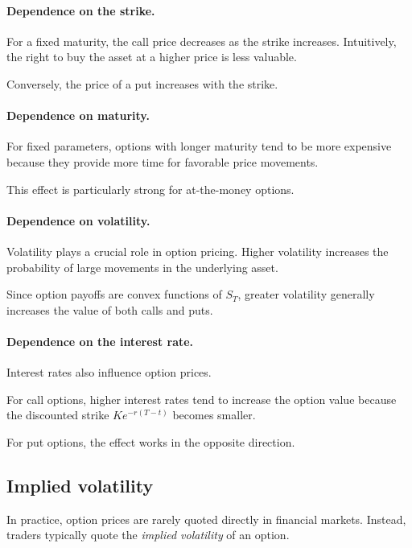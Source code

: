 \documentclass[11pt]{article}
\newcommand{\1}{\mathbf{1}}
\theoremstyle{plain}
\theoremstyle{definition}
\theoremstyle{remark}
\begin{document}
\paragraph{Dependence on the strike.}

For a fixed maturity, the call price decreases as the strike increases.
Intuitively, the right to buy the asset at a higher price is less valuable.

Conversely, the price of a put increases with the strike.

\paragraph{Dependence on maturity.}

For fixed parameters, options with longer maturity tend to be more
expensive because they provide more time for favorable price movements.

This effect is particularly strong for at-the-money options.

\paragraph{Dependence on volatility.}

Volatility plays a crucial role in option pricing.
Higher volatility increases the probability of large movements in the
underlying asset.

Since option payoffs are convex functions of \(S_T\), greater volatility
generally increases the value of both calls and puts.

\paragraph{Dependence on the interest rate.}

Interest rates also influence option prices.

For call options, higher interest rates tend to increase the option value
because the discounted strike \(K e^{-r(T-t)}\) becomes smaller.

For put options, the effect works in the opposite direction.



\subsection{Implied volatility}

In practice, option prices are rarely quoted directly in financial
markets. Instead, traders typically quote the \emph{implied volatility}
of an option.
\end{document}
